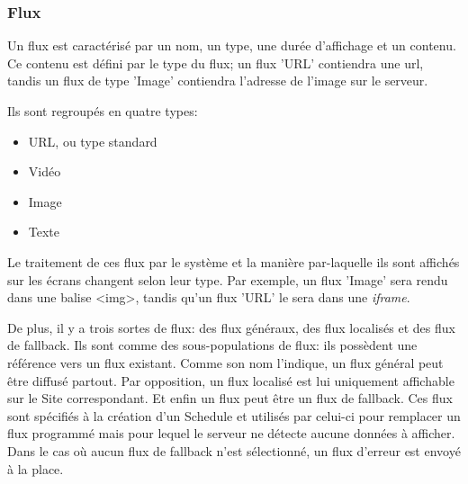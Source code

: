 \documentclass[french]{article}
\begin{document}
\subsubsection{Flux}

Un flux est caractérisé par un nom, un type, une durée d'affichage et un contenu. Ce contenu est défini par le type du flux; un flux 'URL' contiendra une url, tandis un flux de type 'Image' contiendra l'adresse de l'image sur le serveur.

Ils sont regroupés en quatre types:
\begin{itemize}
	\item URL, ou type standard
	\item Vidéo
	\item Image
	\item Texte
\end{itemize}
Le traitement de ces flux par le système et la manière par-laquelle ils sont affichés sur les écrans changent selon leur type. Par exemple, un flux 'Image' sera rendu dans une balise <img>, tandis qu'un flux 'URL' le sera dans une \textit{iframe}.

De plus, il y a trois sortes de flux: des flux généraux, des flux localisés et des flux de fallback. Ils sont comme des sous-populations de flux: ils possèdent une référence vers un flux existant. \newline
Comme son nom l'indique, un flux général peut être diffusé partout. Par opposition, un flux localisé est lui uniquement affichable sur le Site correspondant.
Et enfin un flux peut être un flux de fallback. Ces flux sont spécifiés à la création d'un Schedule et utilisés par celui-ci pour remplacer un flux programmé mais pour lequel le serveur ne détecte aucune données à afficher. Dans le cas où aucun flux de fallback n'est sélectionné, un flux d'erreur est envoyé à la place. \newline 
\end{document}
